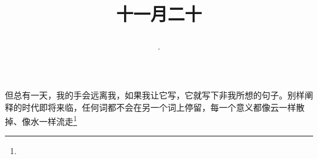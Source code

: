 \title{\date[d=1,m=1,y=2024][year:cn-y,年,month:cn,day:cn,日,·,weekday]·十一月二十 }
但总有一天，我的手会远离我，如果我让它写，它就写下非我所想的句子。别样阐释的时代即将来临，任何词都不会在另一个词上停留，每一个意义都像云一样散掉、像水一样流走\footnote{ }

